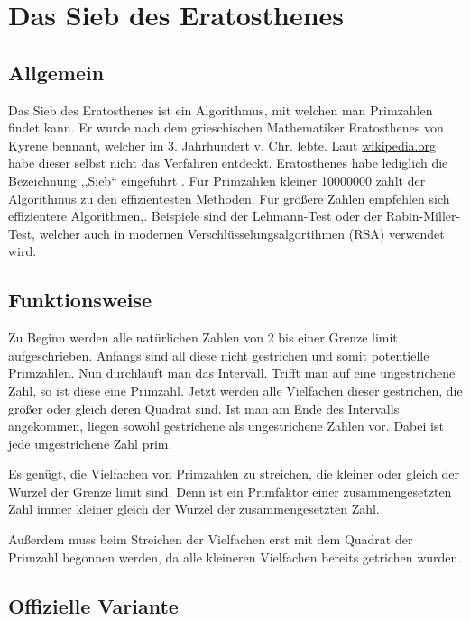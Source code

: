 \documentclass[a4paper,12pt]{article}
\begin{document}
\newpage{}


\section{Das Sieb des Eratosthenes}
\subsection{Allgemein}
Das Sieb des Eratosthenes ist ein Algorithmus, mit welchen man Primzahlen findet kann. Er wurde
nach dem grieschischen Mathematiker Eratosthenes von Kyrene bennant, welcher im 3. Jahrhundert v. Chr. lebte. Laut \href{https://de.wikipedia.org/wiki/Sieb_des_Eratosthenes}{wikipedia.org} habe dieser selbst nicht das Verfahren entdeckt. Eratosthenes habe lediglich die Bezeichnung ,,Sieb“ eingeführt .
Für Primzahlen kleiner 10000000 zählt der Algorithmus zu den effizientesten Methoden. Für größere Zahlen empfehlen sich effizientere Algorithmen,. Beispiele sind der Lehmann-Test oder der Rabin-Miller-Test, welcher auch in modernen Verschlüsselungsalgortihmen (RSA) verwendet wird.

\subsection{Funktionsweise}
Zu Beginn werden alle natürlichen Zahlen von 2 bis einer Grenze limit aufgeschrieben. Anfangs sind all diese nicht gestrichen und somit potentielle Primzahlen. Nun durchläuft man das Intervall. Trifft man auf eine ungestrichene Zahl, so ist diese eine Primzahl. Jetzt werden alle Vielfachen dieser gestrichen, die größer oder gleich deren Quadrat sind. Ist man am Ende des Intervalls angekommen, liegen sowohl gestrichene als ungestrichene Zahlen vor. Dabei ist jede ungestrichene Zahl prim.

Es genügt, die Vielfachen von Primzahlen zu streichen, die kleiner oder gleich der Wurzel der Grenze limit sind. Denn ist ein Primfaktor einer zusammengesetzten Zahl immer kleiner gleich der Wurzel der zusammengesetzten Zahl.

Außerdem muss beim Streichen der Vielfachen erst mit dem Quadrat der Primzahl begonnen werden, da alle kleineren Vielfachen bereits getrichen wurden.

\newpage{}

\subsection{Offizielle Variante}
\end{document}
